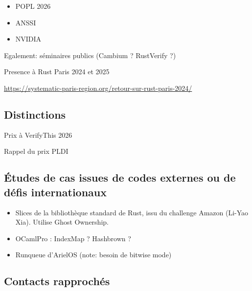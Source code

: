 \documentclass[a4paper,11pt]{article}
\begin{document}
\begin{itemize}
\item POPL 2026
\item ANSSI
\item NVIDIA
\end{itemize}

Egalement: séminaires publics (Cambium ? RustVerify ?)

Presence à Rust Paris 2024 et 2025

  \url{https://systematic-paris-region.org/retour-sur-rust-paris-2024/}

\subsection{Distinctions}

Prix à VerifyThis 2026 \url{}

Rappel du prix PLDI~\cite{matsushita22pldi}

\subsection{Études de cas issues de codes externes ou de défis internationaux}
\label{sec:cas}

\begin{itemize}
\item Slices de la bibliothèque standard de Rust, issu du challenge Amazon
  (Li-Yao Xia). Utilise Ghost Ownership.
\item OCamlPro : IndexMap ? Hashbrown ?
\item Runqueue d’ArielOS (note: besoin de bitwise mode)
\end{itemize}


\subsection{Contacts rapprochés}
\end{document}
